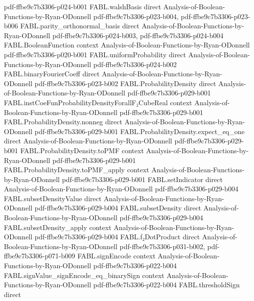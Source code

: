 \begin{theorem}
  {pdf-ffbe9c7b3306-p024-b001}
\proofstep
  {FABL.walshBasis}
  {direct}
  {Analysis-of-Boolean-Functions-by-Ryan-ODonnell}
  {pdf-ffbe9c7b3306-p023-b004,
    pdf-ffbe9c7b3306-p023-b006}
\proofstep
  {FABL.parity_orthonormal_basis}
  {direct}
  {Analysis-of-Boolean-Functions-by-Ryan-ODonnell}
  {pdf-ffbe9c7b3306-p024-b003,
    pdf-ffbe9c7b3306-p024-b004}
\proofstep
  {FABL.BooleanFunction}
  {context}
  {Analysis-of-Boolean-Functions-by-Ryan-ODonnell}
  {pdf-ffbe9c7b3306-p020-b001}
\proofstep
  {FABL.uniformProbability}
  {direct}
  {Analysis-of-Boolean-Functions-by-Ryan-ODonnell}
  {pdf-ffbe9c7b3306-p024-b002}
\proofstep
  {FABL.binaryFourierCoeff}
  {direct}
  {Analysis-of-Boolean-Functions-by-Ryan-ODonnell}
  {pdf-ffbe9c7b3306-p023-b002}
\proofstep
  {FABL.ProbabilityDensity}
  {direct}
  {Analysis-of-Boolean-Functions-by-Ryan-ODonnell}
  {pdf-ffbe9c7b3306-p029-b001}
\proofstep
  {FABL.instCoeFunProbabilityDensityForallF₂CubeReal}
  {context}
  {Analysis-of-Boolean-Functions-by-Ryan-ODonnell}
  {pdf-ffbe9c7b3306-p029-b001}
\proofstep
  {FABL.ProbabilityDensity.nonneg}
  {direct}
  {Analysis-of-Boolean-Functions-by-Ryan-ODonnell}
  {pdf-ffbe9c7b3306-p029-b001}
\proofstep
  {FABL.ProbabilityDensity.expect_eq_one}
  {direct}
  {Analysis-of-Boolean-Functions-by-Ryan-ODonnell}
  {pdf-ffbe9c7b3306-p029-b001}
\proofstep
  {FABL.ProbabilityDensity.toPMF}
  {context}
  {Analysis-of-Boolean-Functions-by-Ryan-ODonnell}
  {pdf-ffbe9c7b3306-p029-b001}
\proofstep
  {FABL.ProbabilityDensity.toPMF_apply}
  {context}
  {Analysis-of-Boolean-Functions-by-Ryan-ODonnell}
  {pdf-ffbe9c7b3306-p029-b001}
\proofstep
  {FABL.setIndicator}
  {direct}
  {Analysis-of-Boolean-Functions-by-Ryan-ODonnell}
  {pdf-ffbe9c7b3306-p029-b004}
\proofstep
  {FABL.subsetDensityValue}
  {direct}
  {Analysis-of-Boolean-Functions-by-Ryan-ODonnell}
  {pdf-ffbe9c7b3306-p029-b004}
\proofstep
  {FABL.subsetDensity}
  {direct}
  {Analysis-of-Boolean-Functions-by-Ryan-ODonnell}
  {pdf-ffbe9c7b3306-p029-b004}
\proofstep
  {FABL.subsetDensity_apply}
  {context}
  {Analysis-of-Boolean-Functions-by-Ryan-ODonnell}
  {pdf-ffbe9c7b3306-p029-b004}
\proofstep
  {FABL.f₂DotProduct}
  {direct}
  {Analysis-of-Boolean-Functions-by-Ryan-ODonnell}
  {pdf-ffbe9c7b3306-p031-b002,
    pdf-ffbe9c7b3306-p071-b009}
\proofstep
  {FABL.signEncode}
  {context}
  {Analysis-of-Boolean-Functions-by-Ryan-ODonnell}
  {pdf-ffbe9c7b3306-p022-b004}
\proofstep
  {FABL.signValue_signEncode_eq_binarySign}
  {context}
  {Analysis-of-Boolean-Functions-by-Ryan-ODonnell}
  {pdf-ffbe9c7b3306-p022-b004}
\proofstep
  {FABL.thresholdSign}
  {direct}

\end{theorem}
